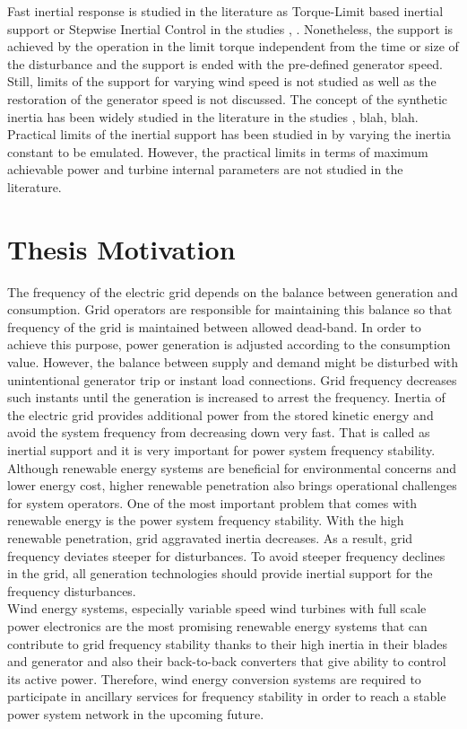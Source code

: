 Fast inertial response is studied in the literature as Torque-Limit based inertial support or Stepwise Inertial Control in the studies \cite{Wang2016b}, \cite{Wang2016}. Nonetheless, the support is achieved by the operation in the limit torque independent from the time or size of the disturbance and the support is ended with the pre-defined generator speed. Still, limits of the support for varying wind speed is not studied as well as the restoration of the generator speed is not discussed. The concept of the synthetic inertia has been widely studied in the literature in the studies \cite{VanDeVyver2016}, blah, blah.
Practical limits of the inertial support has been studied in \cite{Gonzalez-Longatt2016} by varying the inertia constant to be emulated. However, the practical limits in terms of maximum achievable power and turbine internal parameters are not studied in the literature. 

\section{Thesis Motivation}
The frequency of the electric grid depends on the balance between generation and consumption. Grid operators are responsible for maintaining this balance so that frequency of the grid is maintained between allowed dead-band. In order to achieve this purpose, power generation is adjusted according to the consumption value. However, the balance between supply and demand might be disturbed with unintentional generator trip or instant load connections. Grid frequency decreases such instants until the generation is increased to arrest the frequency. Inertia of the electric grid provides additional power from the stored kinetic energy and avoid the system frequency from decreasing down very fast. That is called as inertial support and it is very important for power system frequency stability.\\
Although renewable energy systems are beneficial for environmental concerns and lower energy cost, higher renewable penetration also brings operational challenges for system operators. One of the most important problem that comes with renewable energy is the power system frequency stability. With the high renewable penetration, grid aggravated inertia decreases. As a result, grid frequency deviates steeper for disturbances. To avoid steeper frequency declines in the grid, all generation technologies should provide inertial support for the frequency disturbances.\\
Wind energy systems, especially variable speed wind turbines with full scale power electronics are the most promising renewable energy systems that can contribute to grid frequency stability thanks to their high inertia in their blades and generator and also their back-to-back converters that give ability to control its active power. Therefore, wind energy conversion systems are required to participate in ancillary services for frequency stability in order to reach a stable power system network in the upcoming future. 

